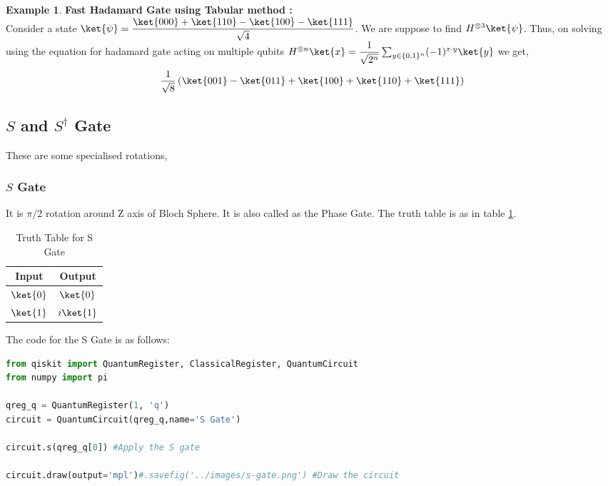 \documentclass[12pt, oneside]{book}
\theoremstyle{definition}
\theoremstyle{definition}
\newtheorem{example}{Example}[section]
\theoremstyle{remark}
\begin{document}
\begin{example}
    \textbf{Fast Hadamard Gate using Tabular method :}\\
    Consider a state $\ket{\psi}=\dfrac{\ket{000}+\ket{110}-\ket{100}-\ket{111}}{\sqrt{4}}$. We are suppose to find
    $H^{\otimes 3}\ket{\psi}$. Thus, on solving using the equation for hadamard gate acting on multiple qubits $H^{\otimes n}\ket{x}=\dfrac{1}{\sqrt{2^n}}\sum_{y \in \{0,1\}^n}(-1)^{x\cdot y}\ket{y}$ 
    we get,
    \[
        \frac{1}{\sqrt{8}}\left(\ket{001}-\ket{011}+\ket{100}+\ket{110}+\ket{111}\right)
    \]
\end{example}




\subsection{$S$ and $S^{\dagger}$ Gate}
These are some specialised rotations,
\subsubsection{$S$ Gate}
It is $\pi/2$ rotation around Z axis of Bloch Sphere.
It is also called as the Phase Gate. The truth table is as in table \ref{tab:s}.
\begin{table}[H]
    \centering
    \begin{tabular}{|c|c|}
        \hline
        Input & Output\\
        \hline
        $\ket{0}$ & $\ket{0}$\\
        $\ket{1}$ & $i\ket{1}$\\
        \hline
    \end{tabular}
    \caption{Truth Table for S Gate}
    \label{tab:s}
\end{table}
The code for the S Gate is as follows:
\begin{lstlisting}[language=Python]
from qiskit import QuantumRegister, ClassicalRegister, QuantumCircuit
from numpy import pi

qreg_q = QuantumRegister(1, 'q')
circuit = QuantumCircuit(qreg_q,name='S Gate')

circuit.s(qreg_q[0]) #Apply the S gate

circuit.draw(output='mpl')#.savefig('../images/s-gate.png') #Draw the circuit
\end{lstlisting}
\end{document}
